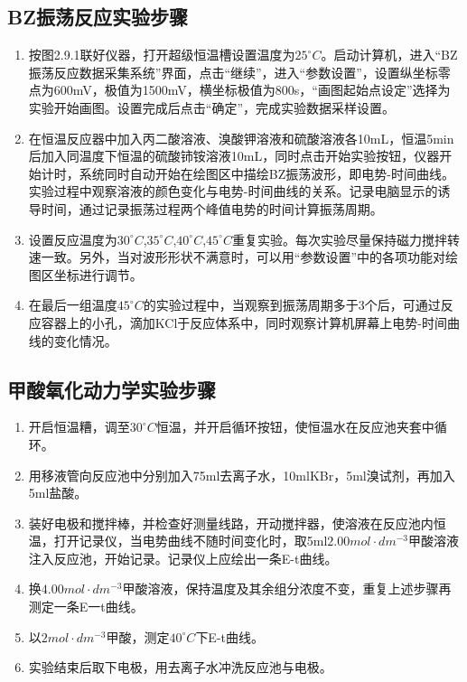 \documentclass[12pt,hyperref,a4paper,UTF8]{ctexart}
\begin{document}
\subsection{BZ振荡反应实验步骤}
\begin{enumerate}
    \item 按图2.9.1联好仪器，打开超级恒温槽设置温度为$25^{\circ} C$。启动计算机，进入“BZ振荡反应数据采集系统”界面，点击“继续”，进入“参数设置”，设置纵坐标零点为600mV，极值为1500mV，横坐标极值为800s，“画图起始点设定”选择为实验开始画图。设置完成后点击“确定”，完成实验数据采样设置。
    \item 在恒温反应器中加入丙二酸溶液、溴酸钾溶液和硫酸溶液各10mL，恒温5min后加入同温度下恒温的硫酸铈铵溶液10mL，同时点击开始实验按钮，仪器开始计时，系统同时自动开始在绘图区中描绘BZ振荡波形，即电势-时间曲线。实验过程中观察溶液的颜色变化与电势-时间曲线的关系。记录电脑显示的诱导时间，通过记录振荡过程两个峰值电势的时间计算振荡周期。
    \item 设置反应温度为$30^{\circ} C$,$35^{\circ} C$,$40^{\circ} C$,$45^{\circ} C$重复实验。每次实验尽量保持磁力搅拌转速一致。另外，当对波形形状不满意时，可以用“参数设置”中的各项功能对绘图区坐标进行调节。
    \item 在最后一组温度$45^{\circ} C$的实验过程中，当观察到振荡周期多于3个后，可通过反应容器上的小孔，滴加KCl于反应体系中，同时观察计算机屏幕上电势-时间曲线的变化情况。

\end{enumerate}

\subsection{甲酸氧化动力学实验步骤}
\begin{enumerate}
    \item 开启恒温糟，调至$30^{\circ} C$恒温，并开启循环按钮，使恒温水在反应池夹套中循环。

\item 用移液管向反应池中分别加入75ml去离子水，10mlKBr，5ml溴试剂，再加入5ml盐酸。

\item 装好电极和搅拌棒，并检查好测量线路，开动搅拌器，使溶液在反应池内恒温，打开记录仪，当电势曲线不随时间变化时，取5ml$2.00mol\cdot dm^{-3}$甲酸溶液注入反应池，开始记录。记录仪上应绘出一条E-t曲线。

\item 换$4.00mol\cdot dm^{-3}$甲酸溶液，保持温度及其余组分浓度不变，重复上述步骤再测定一条E一t曲线。

\item 以$2mol\cdot dm^{-3}$甲酸，测定$40^{\circ} C$下E-t曲线。

\item 实验结束后取下电极，用去离子水冲洗反应池与电极。
\end{enumerate}
\end{document}
